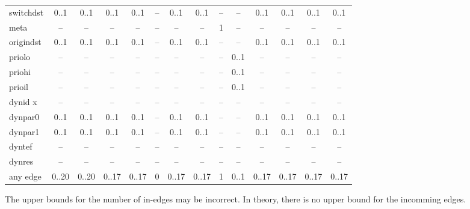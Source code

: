 \begin{table}
\begin{adjustwidth}{-25mm}{}
\begin{tabular}[t]{|l|c|c|c|c|c|c|c|c|c|c|c|c|c|}
switchdst        & 0..1       & 0..1            & 0..1       & 0..1       & --           & 0..1       & 0..1        & --        & --         & 0..1             & 0..1        & 0..1       & 0..1     \\
meta             & --         & --              & --         & --         & --           & --         & --          & 1         & --         & --               & --          & --         & --       \\
origindst        & 0..1       & 0..1            & 0..1       & 0..1       & --           & 0..1       & 0..1        & --        & --         & 0..1             & 0..1        & 0..1       & 0..1     \\
priolo           & --         & --              & --         & --         & --           & --         & --          & --        & 0..1       & --               & --          & --         & --       \\
priohi           & --         & --              & --         & --         & --           & --         & --          & --        & 0..1       & --               & --          & --         & --       \\
prioil           & --         & --              & --         & --         & --           & --         & --          & --        & 0..1       & --               & --          & --         & --       \\
dynid x          & --         & --              & --         & --         & --           & --         & --          & --        & --         & --               & --          & --         & --       \\
dynpar0          & 0..1       & 0..1            & 0..1       & 0..1       & --           & 0..1       & 0..1        & --        & --         & 0..1             & 0..1        & 0..1       & 0..1     \\
dynpar1          & 0..1       & 0..1            & 0..1       & 0..1       & --           & 0..1       & 0..1        & --        & --         & 0..1             & 0..1        & 0..1       & 0..1     \\
dyntef           & --         & --              & --         & --         & --           & --         & --          & --        & --         & --               & --          & --         & --       \\
dynres           & --         & --              & --         & --         & --           & --         & --          & --        & --         & --               & --          & --         & --       \\
any edge         & 0..20      & 0..20           & 0..17      & 0..17      & 0            & 0..17      & 0..17       & 1         & 0..1       & 0..17            & 0..17       & 0..17      & 0..17    \\
\hline
\end{tabular}
\end{adjustwidth}
The upper bounds for the number of in-edges may be incorrect. In theory, there is no upper bound for the incomming edges.


\end{table}
